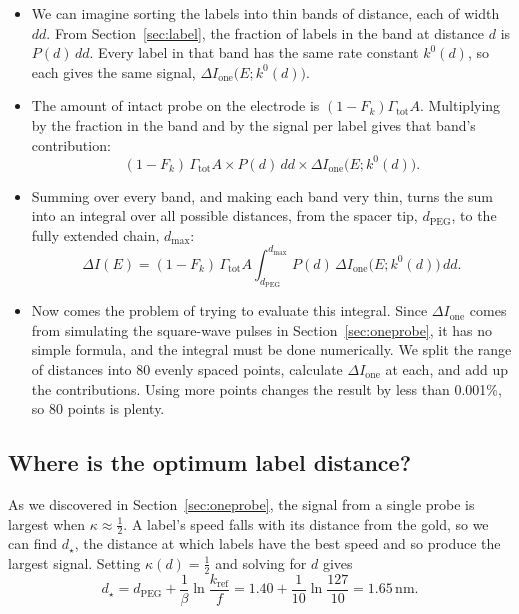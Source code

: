\documentclass[10pt,a4paper]{article}
\numberwithin{equation}{section}
\newcommand{\nm}{\,\mathrm{nm}}
\newcommand{\dpeg}{d_{\mathrm{PEG}}}
\newcommand{\Gtot}{\Gamma_{\mathrm{tot}}}
\newcommand{\kref}{k_{\mathrm{ref}}}
\newcommand{\dropdown}{\par\medskip}
\begin{document}
\dropdown
\begin{itemize}
  \item We can imagine sorting the labels into thin bands of distance, each of width $dd$. From Section~\ref{sec:label}, the fraction of labels in the band at distance $d$ is $P(d)\,dd$. Every label in that band has the same rate constant $k^0(d)$, so each gives the same signal, $\Delta I_{\mathrm{one}}\big(E;k^0(d)\big)$.
  \item The amount of intact probe on the electrode is $(1 - F_k)\Gtot A$. Multiplying by the fraction in the band and by the signal per label gives that band's contribution:
  \[ (1 - F_k)\,\Gtot A\times P(d)\,dd\times\Delta I_{\mathrm{one}}\big(E;k^0(d)\big). \]
  \item Summing over every band, and making each band very thin, turns the sum into an integral over all possible distances, from the spacer tip, $\dpeg$, to the fully extended chain, $d_{\max}$:
  \[ \Delta I(E) = (1 - F_k)\,\Gtot A\int_{\dpeg}^{d_{\max}}P(d)\,\Delta I_{\mathrm{one}}\big(E;k^0(d)\big)\,dd. \]
  \item Now comes the problem of trying to evaluate this integral. Since $\Delta I_{\mathrm{one}}$ comes from simulating the square-wave pulses in Section~\ref{sec:oneprobe}, it has no simple formula, and the integral must be done numerically. We split the range of distances into 80 evenly spaced points, calculate $\Delta I_{\mathrm{one}}$ at each, and add up the contributions. Using more points changes the result by less than 0.001\%, so 80 points is plenty.
\end{itemize}

\subsection{Where is the optimum label distance?}
As we discovered in Section~\ref{sec:oneprobe}, the signal from a single probe is largest when $\kappa\approx\frac12$. A label's speed falls with its distance from the gold, so we can find $d_\star$, the distance at which labels have the best speed and so produce the largest signal. Setting $\kappa(d) = \frac12$ and solving for $d$ gives
\[ d_\star = \dpeg + \frac1\beta\ln\frac{\kref}{f} = 1.40 + \frac{1}{10}\ln\frac{127}{10} = 1.65\nm. \]
\end{document}
